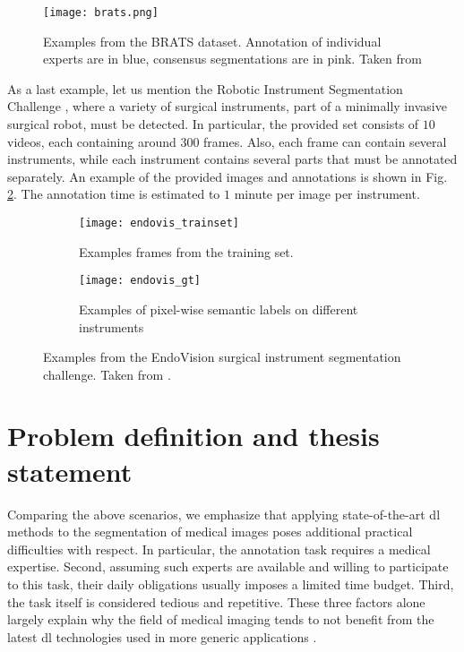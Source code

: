 \begin{figure}[!htpb]
  \texttt{[image: brats.png]}
  \caption{Examples from the BRATS dataset. Annotation of individual experts are in blue, consensus segmentations are in pink. Taken from \cite{menze15}}
  \label{fig:brats}
\end{figure}

As a last example, let us mention the Robotic Instrument Segmentation Challenge \cite{allan19}, where a variety of surgical instruments, part of a minimally invasive surgical robot, must be detected.
In particular, the provided set consists of $10$ videos, each containing around $300$ frames.
Also, each frame can contain several instruments, while each instrument contains several parts that must be annotated separately.
An example of the provided images and annotations is shown in Fig. \ref{fig:intro_endovis}.
The annotation time is estimated to $1$ minute per image per instrument.

\begin{figure}[t!]
    \centering
    \begin{subfigure}[b]{0.5\textwidth}
        \centering
        \texttt{[image: endovis\_trainset]}
        \caption{Examples frames from the training set.}
    \end{subfigure}%
    \begin{subfigure}[b]{0.5\textwidth}
        \centering
        \texttt{[image: endovis\_gt]}
        \caption{Examples of pixel-wise semantic labels on different instruments}
    \end{subfigure}
    \caption{Examples from the EndoVision surgical instrument segmentation challenge. Taken from \cite{allan19}.}
    \label{fig:intro_endovis}
\end{figure}

\section{Problem definition and thesis statement}

Comparing the above scenarios, we emphasize that applying state-of-the-art \gls{dl} methods to the segmentation of medical images poses additional practical difficulties with respect.
In particular, the annotation task requires a medical expertise.
Second, assuming such experts are available and willing to participate to this task, their daily obligations usually imposes a limited time budget.
Third, the task itself is considered tedious and repetitive.
These three factors alone largely explain why the field of medical imaging tends to not benefit from the latest \gls{dl} technologies used in more generic applications \cite{orting19}.

